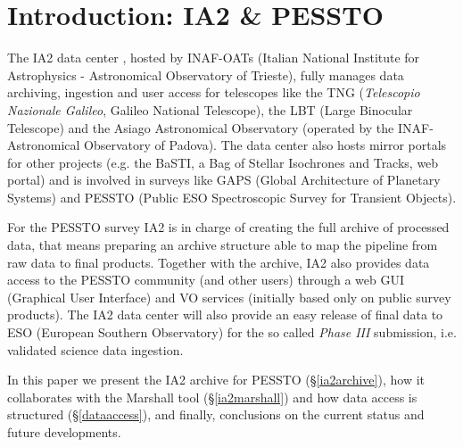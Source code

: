 \section{Introduction: IA2 \& PESSTO}

The IA2 data center \citep{molinaro_spie12}, hosted by INAF-OATs (Italian National Institute for Astrophysics - Astronomical Observatory of Trieste), fully manages data archiving, ingestion and user access for telescopes like the TNG (\textit{Telescopio Nazionale Galileo}, Galileo National Telescope), the LBT (Large Binocular Telescope) and the Asiago Astronomical Observatory (operated by the INAF-Astronomical Observatory of Padova). The data center also hosts mirror portals for other projects (e.g. the BaSTI, a Bag of Stellar Isochrones and Tracks, web portal) and is involved in surveys like GAPS (Global Architecture of Planetary Systems) and PESSTO (Public ESO Spectroscopic Survey for Transient Objects).

For the PESSTO survey IA2 is in charge of creating the full archive of processed data, that means preparing an archive structure able to map the pipeline from raw data to final products. Together with the archive, IA2 also provides data access to the PESSTO community (and other users) through a web GUI (Graphical User Interface) and VO services (initially based only on public survey products). The IA2 data center will also provide an easy release of final data to ESO (European Southern Observatory) for the so called \textit{Phase III} submission, i.e. validated science data ingestion.

In this paper we present the IA2 archive for PESSTO (\S\ref{ia2archive}), how it collaborates with the Marshall tool (\S\ref{ia2marshall}) and how data access is structured (\S\ref{dataaccess}), and finally, conclusions on the current status and future developments.


